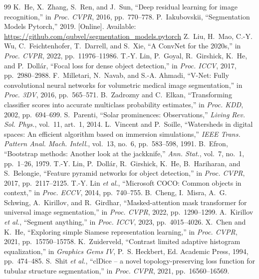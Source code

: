 \documentclass[conference]{IEEEtran}
\begin{document}
\begin{thebibliography}{99}
 K.~He, X.~Zhang, S.~Ren, and J.~Sun, ``Deep residual learning for image recognition,'' in \emph{Proc. CVPR}, 2016, pp.~770--778.
 P.~Iakubovskii, ``Segmentation Models Pytorch,'' 2019. [Online]. Available: \url{https://github.com/qubvel/segmentation_models.pytorch}
 Z.~Liu, H.~Mao, C.-Y. Wu, C.~Feichtenhofer, T.~Darrell, and S.~Xie, ``A ConvNet for the 2020s,'' in \emph{Proc. CVPR}, 2022, pp.~11976--11986.
 T.-Y. Lin, P.~Goyal, R.~Girshick, K.~He, and P.~Doll\'ar, ``Focal loss for dense object detection,'' in \emph{Proc. ICCV}, 2017, pp.~2980--2988.
 F.~Milletari, N.~Navab, and S.-A. Ahmadi, ``V-Net: Fully convolutional neural networks for volumetric medical image segmentation,'' in \emph{Proc. 3DV}, 2016, pp.~565--571.
 B.~Zadrozny and C.~Elkan, ``Transforming classifier scores into accurate multiclass probability estimates,'' in \emph{Proc. KDD}, 2002, pp.~694--699.
 S.~Parenti, ``Solar prominences: Observations,'' \emph{Living Rev. Sol. Phys.}, vol.~11, art.~1, 2014.
 L.~Vincent and P.~Soille, ``Watersheds in digital spaces: An efficient algorithm based on immersion simulations,'' \emph{IEEE Trans. Pattern Anal. Mach. Intell.}, vol.~13, no.~6, pp.~583--598, 1991.
 B.~Efron, ``Bootstrap methods: Another look at the jackknife,'' \emph{Ann. Stat.}, vol.~7, no.~1, pp.~1--26, 1979.
 T.-Y. Lin, P.~Doll\'ar, R.~Girshick, K.~He, B.~Hariharan, and S.~Belongie, ``Feature pyramid networks for object detection,'' in \emph{Proc. CVPR}, 2017, pp.~2117--2125.
 T.-Y. Lin \emph{et al.}, ``Microsoft COCO: Common objects in context,'' in \emph{Proc. ECCV}, 2014, pp.~740--755.
 B.~Cheng, I.~Misra, A.~G. Schwing, A.~Kirillov, and R.~Girdhar, ``Masked-attention mask transformer for universal image segmentation,'' in \emph{Proc. CVPR}, 2022, pp.~1290--1299.
 A.~Kirillov \emph{et al.}, ``Segment anything,'' in \emph{Proc. ICCV}, 2023, pp.~4015--4026.
 X.~Chen and K.~He, ``Exploring simple Siamese representation learning,'' in \emph{Proc. CVPR}, 2021, pp.~15750--15758.
 K.~Zuiderveld, ``Contrast limited adaptive histogram equalization,'' in \emph{Graphics Gems IV}, P.~S. Heckbert, Ed. Academic Press, 1994, pp.~474--485.
 S.~Shit \emph{et al.}, ``clDice -- a novel topology-preserving loss function for tubular structure segmentation,'' in \emph{Proc. CVPR}, 2021, pp.~16560--16569.

\end{thebibliography}
\end{document}
